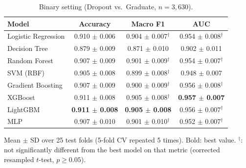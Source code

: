\begin{table}[H]
\centering
\small
\setlength{\tabcolsep}{3.5pt}
\caption{Binary setting (Dropout vs.\ Graduate, $n=3{,}630$).}
\label{tab:binary}
\begin{tabular}{lccc}
\toprule
Model & Accuracy & Macro F1 & AUC \\
\midrule
Logistic Regression & 0.910 $\pm$ 0.006 & 0.904 $\pm$ 0.007$^{\dagger}$ & 0.954 $\pm$ 0.008$^{\dagger}$ \\
Decision Tree & 0.879 $\pm$ 0.009 & 0.871 $\pm$ 0.010 & 0.902 $\pm$ 0.011 \\
Random Forest & 0.907 $\pm$ 0.009 & 0.901 $\pm$ 0.009$^{\dagger}$ & 0.954 $\pm$ 0.007$^{\dagger}$ \\
SVM (RBF) & 0.905 $\pm$ 0.008 & 0.899 $\pm$ 0.008$^{\dagger}$ & 0.948 $\pm$ 0.007 \\
Gradient Boosting & 0.907 $\pm$ 0.009 & 0.900 $\pm$ 0.009$^{\dagger}$ & 0.956 $\pm$ 0.008$^{\dagger}$ \\
XGBoost & 0.911 $\pm$ 0.008 & 0.905 $\pm$ 0.008$^{\dagger}$ & \textbf{0.957 $\pm$ 0.007} \\
LightGBM & \textbf{0.911 $\pm$ 0.008} & \textbf{0.905 $\pm$ 0.008} & 0.956 $\pm$ 0.007$^{\dagger}$ \\
MLP & 0.907 $\pm$ 0.010 & 0.901 $\pm$ 0.010$^{\dagger}$ & 0.952 $\pm$ 0.007$^{\dagger}$ \\
\bottomrule
\end{tabular}
\par\smallskip\footnotesize Mean $\pm$ SD over 25 test folds (5-fold CV repeated 5 times). Bold: best value. $^{\dagger}$: not significantly different from the best model on that metric (corrected resampled $t$-test, $p\ge 0.05$).
\end{table}
